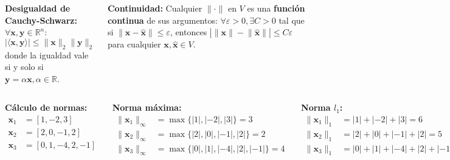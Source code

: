 \documentclass[9pt, aspectratio=169]{beamer}
\begin{document}
\begin{frame}
\begin{columns}[t]
\textbf{Desigualdad de Cauchy-Schwarz:} $\forall \bm{x}, \bm{y} \in \mathbb{R}^n$:
\[ | \langle \bm{x}, \bm{y} \rangle | \leq \lVert \bm{x}  \rVert_2 \lVert \bm{y} \rVert_2 \]
donde la igualdad vale si y solo si $\bm{y} = \alpha \bm{x}, \alpha \in \mathbb{R}$.

\textbf{Continuidad:} Cualquier $\lVert \cdot \rVert$ en $V$ es una \textbf{función continua} de sus argumentos: $\forall \varepsilon > 0, \exists C > 0$ tal que si $\lVert \bm{x} - \hat{\bm{x}} \rVert \leq \varepsilon$, entonces $| \lVert \bm{x} \rVert - \lVert \hat{\bm{x}} \rVert | \leq C \varepsilon$ para cualquier $\bm{x}, \hat{\bm{x}} \in V$.
\end{columns}
\end{frame}

\begin{frame}
\begin{columns}[t]
\textbf{Cálculo de normas:}
\begin{align*}
  \bm{x}_1 &= [1, -2, 3] \\
  \bm{x}_2 &= [2, 0, -1, 2] \\
  \bm{x}_3 &= [0, 1, -4, 2, -1] \\
\end{align*}

\textbf{Norma máxima:}
\begin{align*}
\lVert  \bm{x}_1 \rVert_{\infty} &= \max \{|1|, |-2|, |3|\} = 3\\
\lVert  \bm{x}_2 \rVert_{\infty} &= \max \{|2|, |0|, |-1|, |2|\} = 2\\
\lVert  \bm{x}_3 \rVert_{\infty} &= \max \{|0|, |1|, |-4|, |2|, |-1|\} = 4 \\
\end{align*}

\textbf{Norma $l_1$:}
\begin{align*}
\lVert  \bm{x}_1 \rVert_1 &=  |1| + |-2| + |3| = 6\\
\lVert  \bm{x}_2 \rVert_1 &= |2| + |0| + |-1| + |2|= 5\\
\lVert  \bm{x}_3 \rVert_1 &= |0| +|1| + |-4| + |2| + |-1| = 8 \\
\end{align*}

\textbf{Norma $l_2$:}
\begin{align*}
  \lVert  \bm{x}_1 \rVert_2 &= \sqrt{|1|^2 + |-2|^2 + |3|^2} = \sqrt{14} \approx 3.74\\
  \lVert  \bm{x}_2 \rVert_2 &= \sqrt{|2|^2 + |0|^2 + |-1|^2 + |2|^2}= \sqrt{9} =3\\
  \lVert  \bm{x}_3 \rVert_2 &= \sqrt{|0|^2 +|1|^2 + |-4|^2 + |2|^2 + |-1|^2} = \sqrt{22} \approx 4.69\\
\end{align*}
\end{columns}
\end{frame}
\end{document}
